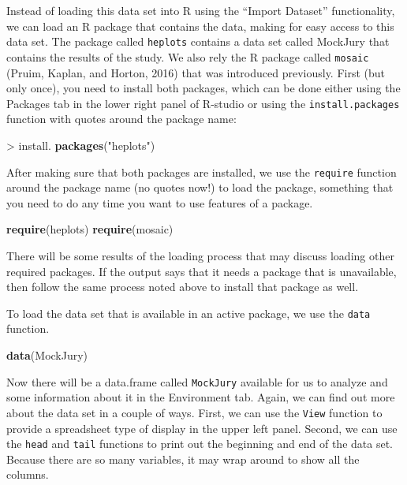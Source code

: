 \documentclass[]{book}
\newenvironment{Shaded}{\begin{snugshade}}{\end{snugshade}}
\newcommand{\KeywordTok}[1]{\textcolor[rgb]{0.13,0.29,0.53}{\textbf{{#1}}}}
\newcommand{\StringTok}[1]{\textcolor[rgb]{0.31,0.60,0.02}{{#1}}}
\newcommand{\NormalTok}[1]{{#1}}
\begin{document}
Instead of loading this data set into R using the ``Import Dataset''
functionality, we can load an R package that contains the data, making
for easy access to this data set. The package called \texttt{heplots}
contains a data set called MockJury that contains the results of the
study. We also rely the R package called \texttt{mosaic} (Pruim, Kaplan,
and Horton, 2016) that was introduced previously. First (but only once),
you need to install both packages, which can be done either using the
Packages tab in the lower right panel of R-studio or using the
\texttt{install.packages} function with quotes around the package name:

\begin{Shaded}
\begin{Highlighting}[]
\NormalTok{>}\StringTok{ }\NormalTok{install. }\KeywordTok{packages}\NormalTok{(}\StringTok{"heplots"}\NormalTok{)}
\end{Highlighting}
\end{Shaded}

After making sure that both packages are installed, we use the
\texttt{require} function around the package name (no quotes now!) to
load the package, something that you need to do any time you want to use
features of a package.

\begin{Shaded}
\begin{Highlighting}[]
\KeywordTok{require}\NormalTok{(heplots)}
\KeywordTok{require}\NormalTok{(mosaic)}
\end{Highlighting}
\end{Shaded}

There will be some results of the loading process that may discuss
loading other required packages. If the output says that it needs a
package that is unavailable, then follow the same process noted above to
install that package as well.

To load the data set that is available in an active package, we use the
\texttt{data} function.

\begin{Shaded}
\begin{Highlighting}[]
\KeywordTok{data}\NormalTok{(MockJury)}
\end{Highlighting}
\end{Shaded}

Now there will be a data.frame called \texttt{MockJury} available for us
to analyze and some information about it in the Environment tab. Again,
we can find out more about the data set in a couple of ways. First, we
can use the \texttt{View} function to provide a spreadsheet type of
display in the upper left panel. Second, we can use the \texttt{head}
and \texttt{tail} functions to print out the beginning and end of the
data set. Because there are so many variables, it may wrap around to
show all the columns.
\end{document}
